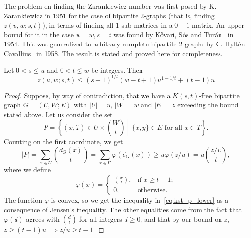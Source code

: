The problem on finding the Zarankiewicz number was first posed by K. Zarankiewicz in 1951 for the
case of bipartite 2-graphs (that is, finding $z(u, w; s, t)$),
in terms of finding all-1 sub-matrices in a $0-1$ matrix.
An upper bound for it in the case $u=w, s=t$ was found by Kővari, Sós and Turán~\cite{Kovari1954} in 1954.
This was generalized to arbitrary complete
bipartite 2-graphs by C. Hyltén-Cavallius~\cite{Hylten1958} in 1958.
The result is stated and proved here for completeness.

\begin{theorem} \label{thm:kst}
    Let $0 < s \leq u$ and $0 < t \leq w$ be integers.
    Then 
    \[z(u, w; s, t) \leq (s - 1)^{1 / t}(w - t + 1)u^{1 - 1 / t} + (t - 1)u\]
    \begin{proof}
        Suppose, by way of contradiction, that we have a $K(s, t)$-free bipartite graph $G = (U, W; E)$
        with $|U| = u$, $|W| = w$ and $|E| = z$ exceeding the bound stated above.
        Let us consider the set
        \[
            P = \left\{ (x, T) \in U \times \binom{W}{t}
            \middle\vert\, \{x, y\} \in E \text{ for all } x \in T \right\}.
        \]
        Counting on the first coordinate, we get
        \begin{equation} \label{eq:kst_p_lower}
            |P| =
            \sum_{x \in U} \binom{d_G(x)}{t} =
            \sum_{x \in U} \varphi(d_G(x)) \geq
            u \varphi(z/u) =
            u \binom{z / u}{t},
        \end{equation}
        where we define
        \[
            \varphi(x) =
            \begin{cases}
                \binom{x}{t}, & \text{if } x \geq t - 1; \\
                0, & \text{otherwise.}
            \end{cases}
        \]
        The function $\varphi$ is convex, so we get the inequality in~\eqref{eq:kst_p_lower}
        as a consequence of Jensen's inequality.
        The other equalities come from the fact that $\varphi(d)$ agrees
        with $\binom{d}{t}$ for all integers $d \geq 0$;
        and that by our bound on $z$, $z \geq (t-1)u \implies z/u \geq t - 1$.


\end{proof}
\end{theorem}
